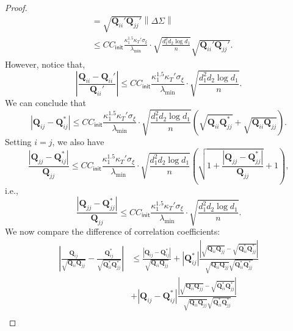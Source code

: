 \documentclass[12pt]{article}
\newcommand{\abs}[1]{\left\lvert#1\right\rvert}
\newcommand{\norm}[1]{\left\lVert#1\right\rVert}
\newcommand{\init}{{\mathsf{init}}}
\theoremstyle{plain}
\begin{document}
\begin{proof}
\begin{equation*}
\begin{aligned}
      & = \sqrt{\mathbf{Q}_{ii}'\mathbf{Q}_{jj}'}\norm{\Delta \Sigma}  \\
      & \le CC_{\init}\frac{\kappa_1^{1.5} \kappa_T'  \sigma_{\xi} }{ \lambda_{\min}  }\cdot \sqrt{\frac{ d_1^2 d_2 \log d_1}{n}} \sqrt{\mathbf{Q}_{ii}'\mathbf{Q}_{jj}'}.
    \end{aligned}
\end{equation*}
However, notice that, 
\begin{equation*}
    \abs{\frac{\mathbf{Q}_{ii}- \mathbf{Q}_{ii}'}{\mathbf{Q}_{ii}' } }\le CC_{\init}\frac{\kappa_1^{1.5} \kappa_T'  \sigma_{\xi} }{ \lambda_{\min}  }\cdot \sqrt{\frac{ d_1^2 d_2 \log d_1}{n}}.
\end{equation*}
We can conclude that 
\begin{equation*}
    \abs{\mathbf{Q}_{ij}-\mathbf{Q}_{ij}^*} \le CC_{\init}\frac{\kappa_1^{1.5} \kappa_T'  \sigma_{\xi} }{ \lambda_{\min}  }\cdot \sqrt{\frac{ d_1^2 d_2 \log d_1}{n}} \left(\sqrt{\mathbf{Q}_{ii}\mathbf{Q}_{jj}^* }+ \sqrt{\mathbf{Q}_{ii}\mathbf{Q}_{jj} } \right).
\end{equation*}
Setting $i=j$, we also have
\begin{equation*}
    \frac{\abs{\mathbf{Q}_{jj}-\mathbf{Q}_{ij}^*}}{ \mathbf{Q}_{jj}} \le CC_{\init}\frac{\kappa_1^{1.5} \kappa_T'  \sigma_{\xi} }{ \lambda_{\min}  }\cdot \sqrt{\frac{ d_1^2 d_2 \log d_1}{n}}\left(\sqrt{1+{\frac{\abs{\mathbf{Q}_{jj}-\mathbf{Q}_{jj}^*}}{ \mathbf{Q}_{jj}}} }+ 1 \right),
\end{equation*}
i.e.,
\begin{equation*}
      \frac{\abs{\mathbf{Q}_{jj}-\mathbf{Q}_{jj}^*}}{ \mathbf{Q}_{jj}} \le CC_{\init}\frac{\kappa_1^{1.5} \kappa_T'  \sigma_{\xi} }{ \lambda_{\min}  }\cdot \sqrt{\frac{ d_1^2 d_2 \log d_1}{n}}.
\end{equation*}
We now compare the difference of correlation coefficients:
\begin{equation*}
\begin{aligned}
       \abs{\frac{\mathbf{Q}_{ij} }{\sqrt{\mathbf{Q}_{ii}\mathbf{Q}_{jj}}} - {\frac{\mathbf{Q}_{ij}^* }{\sqrt{\mathbf{Q}_{ii}^*\mathbf{Q}_{jj}^*}} } } &\le \frac{  \abs{\mathbf{Q}_{ij}-\mathbf{Q}_{ij}^*}  }{ \sqrt{\mathbf{Q}_{ii}\mathbf{Q}_{jj}} }+ \abs{\mathbf{Q}_{ij}^*}\frac{\abs{\sqrt{\mathbf{Q}_{ii}\mathbf{Q}_{jj}}-\sqrt{\mathbf{Q}_{ii}^*\mathbf{Q}_{jj}^*}}}{\sqrt{\mathbf{Q}_{ii}\mathbf{Q}_{jj}} \sqrt{\mathbf{Q}_{ii}^*\mathbf{Q}_{jj}^*}  }\\
    & + \abs{\mathbf{Q}_{ij}-\mathbf{Q}_{ij}^*} \frac{\abs{\sqrt{\mathbf{Q}_{ii}\mathbf{Q}_{jj}}-\sqrt{\mathbf{Q}_{ii}^*\mathbf{Q}_{jj}^*}}}{\sqrt{\mathbf{Q}_{ii}\mathbf{Q}_{jj}} \sqrt{\mathbf{Q}_{ii}^*\mathbf{Q}_{jj}^*}  } \\

\end{aligned}
\end{equation*}
\end{proof}
\end{document}
